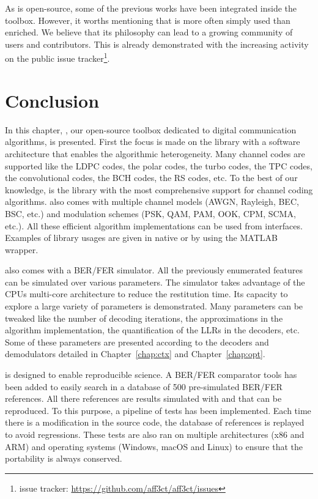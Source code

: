 As \AFFECT is open-source, some of the previous works have been integrated
inside the toolbox. However, it worths mentioning that \AFFECT is more often
simply used than enriched. We believe that its philosophy can lead to a growing
community of users and contributors. This is already demonstrated with the
increasing activity on the public issue tracker\footnote{\AFFECT issue tracker:
\url{https://github.com/aff3ct/aff3ct/issues}}.

\section{Conclusion}

In this chapter, \AFFECT, our open-source toolbox dedicated to digital
communication algorithms, is presented. First the focus is made on the library
with a software architecture that enables the algorithmic heterogeneity. Many
channel codes are supported like the LDPC codes, the polar codes, the turbo
codes, the TPC codes, the convolutional codes, the BCH codes, the RS codes, etc.
To the best of our knowledge, \AFFECT is the library with the most comprehensive
support for channel coding algorithms. \AFFECT also comes with multiple channel
models (AWGN, Rayleigh, BEC, BSC, etc.) and modulation schemes (PSK, QAM, PAM,
OOK, CPM, SCMA, etc.). All these efficient algorithm implementations can be
used from interfaces. Examples of library usages are given in native \Cxx or
by using the MATLAB wrapper.

\AFFECT also comes with a BER/FER simulator. All the previously enumerated
features can be simulated over various parameters. The simulator takes advantage
of the CPUs multi-core architecture to reduce the restitution time. Its capacity
to explore a large variety of parameters is demonstrated. Many parameters can be
tweaked like the number of decoding iterations, the approximations in the
algorithm implementation, the quantification of the LLRs in the decoders, etc.
Some of these parameters are presented according to the decoders and
demodulators detailed in Chapter~\ref{chap:ctx} and Chapter~\ref{chap:opt}.

\AFFECT is designed to enable reproducible science. A BER/FER comparator tools
has been added to easily search in a database of 500 pre-simulated BER/FER
references. All there references are results simulated with \AFFECT and that can
be reproduced. To this purpose, a pipeline of tests has been implemented. Each
time there is a modification in the source code, the database of references is
replayed to avoid regressions. These tests are also ran on multiple
architectures (x86 and ARM\R) and operating systems (Windows, macOS and Linux)
to ensure that the portability is always conserved.

